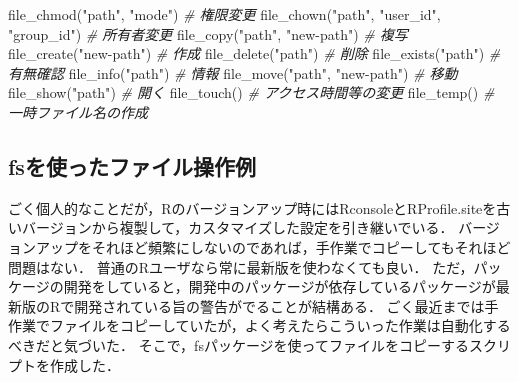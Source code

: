 \documentclass[
]{article}
\newenvironment{Shaded}{\begin{snugshade}}{\end{snugshade}}
\newcommand{\CommentTok}[1]{\textcolor[rgb]{0.56,0.35,0.01}{\textit{#1}}}
\newcommand{\FunctionTok}[1]{\textcolor[rgb]{0.00,0.00,0.00}{#1}}
\newcommand{\NormalTok}[1]{#1}
\newcommand{\StringTok}[1]{\textcolor[rgb]{0.31,0.60,0.02}{#1}}
\begin{document}
\begin{Shaded}
\begin{Highlighting}[]
\FunctionTok{file\_chmod}\NormalTok{(}\StringTok{"path"}\NormalTok{, }\StringTok{"mode"}\NormalTok{)                }\CommentTok{\# 権限変更   }
\FunctionTok{file\_chown}\NormalTok{(}\StringTok{"path"}\NormalTok{, }\StringTok{"user\_id"}\NormalTok{, }\StringTok{"group\_id"}\NormalTok{) }\CommentTok{\# 所有者変更   }
\FunctionTok{file\_copy}\NormalTok{(}\StringTok{"path"}\NormalTok{, }\StringTok{"new{-}path"}\NormalTok{)             }\CommentTok{\# 複写   }
\FunctionTok{file\_create}\NormalTok{(}\StringTok{"new{-}path"}\NormalTok{)                   }\CommentTok{\# 作成   }
\FunctionTok{file\_delete}\NormalTok{(}\StringTok{"path"}\NormalTok{)                       }\CommentTok{\# 削除   }
\FunctionTok{file\_exists}\NormalTok{(}\StringTok{"path"}\NormalTok{)                       }\CommentTok{\# 有無確認   }
\FunctionTok{file\_info}\NormalTok{(}\StringTok{"path"}\NormalTok{)                         }\CommentTok{\# 情報   }
\FunctionTok{file\_move}\NormalTok{(}\StringTok{"path"}\NormalTok{, }\StringTok{"new{-}path"}\NormalTok{)             }\CommentTok{\# 移動   }
\FunctionTok{file\_show}\NormalTok{(}\StringTok{"path"}\NormalTok{)                         }\CommentTok{\# 開く   }
\FunctionTok{file\_touch}\NormalTok{()                              }\CommentTok{\# アクセス時間等の変更   }
\FunctionTok{file\_temp}\NormalTok{()                               }\CommentTok{\# 一時ファイル名の作成   }
\end{Highlighting}
\end{Shaded}

\hypertarget{fsux3092ux4f7fux3063ux305fux30d5ux30a1ux30a4ux30ebux64cdux4f5cux4f8b}{%
\subsection{fsを使ったファイル操作例}\label{fsux3092ux4f7fux3063ux305fux30d5ux30a1ux30a4ux30ebux64cdux4f5cux4f8b}}

ごく個人的なことだが，Rのバージョンアップ時にはRconsoleとRProfile.siteを古いバージョンから複製して，カスタマイズした設定を引き継いでいる．
バージョンアップをそれほど頻繁にしないのであれば，手作業でコピーしてもそれほど問題はない．
普通のRユーザなら常に最新版を使わなくても良い．
ただ，パッケージの開発をしていると，開発中のパッケージが依存しているパッケージが最新版のRで開発されている旨の警告がでることが結構ある．
ごく最近までは手作業でファイルをコピーしていたが，よく考えたらこういった作業は自動化するべきだと気づいた．
そこで，fsパッケージを使ってファイルをコピーするスクリプトを作成した．
\end{document}
